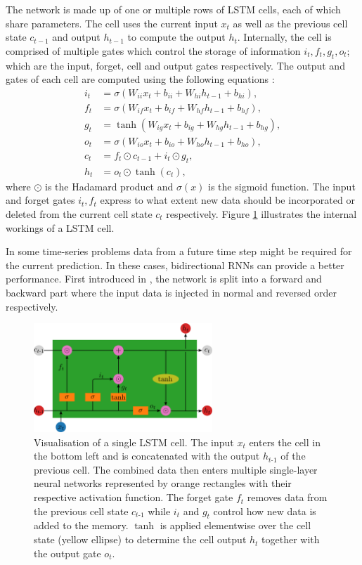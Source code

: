 The network is made up of one or multiple rows of LSTM cells, each of which share parameters.
The cell uses the current input $x_t$ as well as the previous cell state $c_{t-1}$ and output $h_{t-1}$ to compute the output $h_t$.
Internally, the cell is comprised of multiple gates which control the storage of information $i_t, f_t, g_t, o_t$; which are the input, forget, cell and output gates respectively.
The output and gates of each cell are computed using the following equations \cite{NEURIPS2019_9015}:
\begin{align*}
i_t & = \sigma (W_{ii} x_t + b_{ii} + W_{hi} h_{t-1} + b_{hi}), \\
f_t & = \sigma (W_{if} x_t + b_{if} + W_{hf} h_{t-1} + b_{hf}), \\
g_t & = \tanh (W_{ig} x_t + b_{ig} + W_{hg} h_{t-1} + b_{hg}), \\ 
o_t & = \sigma (W_{io} x_t + b_{io} + W_{ho} h_{t-1} + b_{ho}), \\
c_t & = f_t \odot c_{t-1} + i_t \odot g_t, \\
h_t & = o_t \odot \tanh (c_t),
\end{align*}
where $\odot$ is the Hadamard product and $\sigma(x)$ is the sigmoid function.
The input and forget gates $i_t, f_t$ express to what extent new data should be incorporated or deleted from the current cell state $c_t$ respectively.
Figure \ref{lstm} illustrates the internal workings of a LSTM cell.

In some time-series problems data from a future time step might be required for the current prediction.
In these cases, bidirectional RNNs can provide a better performance.
First introduced in \cite{bidirrnn}, the network is split into a forward and backward part where the input data is injected in normal and reversed order respectively.

\begin{figure}
	\centering
	\includegraphics[width=0.6\textwidth]{img/lstm}
	\caption{Visualisation of a single LSTM cell. The input $x_t$ enters the cell in the bottom left and is concatenated with the output $h_{t\text{-}1}$ of the previous cell. The combined data then enters multiple single-layer neural networks represented by orange rectangles with their respective activation function. The forget gate $f_t$ removes data from the previous cell state $c_{t\text{-}1}$ while $i_t$ and $g_t$ control how new data is added to the memory. $\tanh$ is applied elementwise over the cell state (yellow ellipse) to determine the cell output $h_t$ together with the output gate $o_t$.}
	\label{lstm}
\end{figure}

